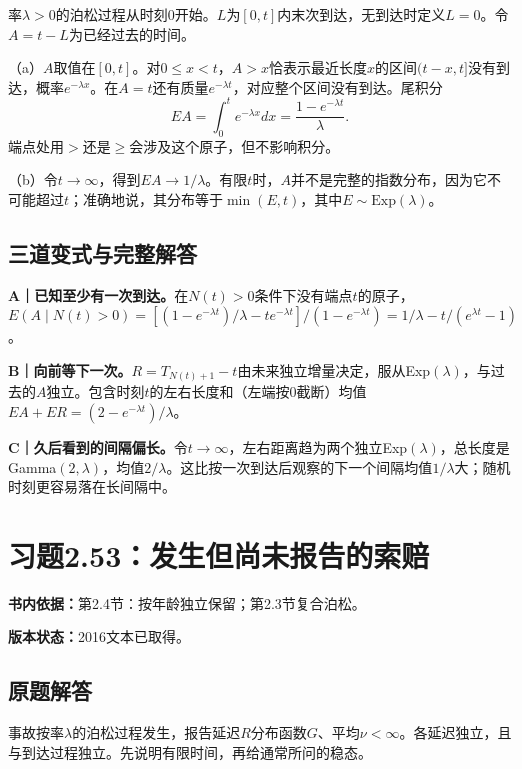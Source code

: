 \documentclass[
  11pt,
  a4paper,
  UTF8,fontset=fandol]{ctexart}
\let\OldSection\section
\renewcommand{\section}{\Needspace{7\baselineskip}\OldSection}
\let\OldSubsection\subsection
\renewcommand{\subsection}{\Needspace{5\baselineskip}\OldSubsection}
\begin{document}
率\(\lambda>0\)的泊松过程从时刻0开始。\(L\)为\([0,t]\)内末次到达，无到达时定义\(L=0\)。令\(A=t-L\)为已经过去的时间。

（a）\(A\)取值在\([0,t]\)。对\(0\le x<t\)，\(A>x\)恰表示最近长度\(x\)的区间\((t-x,t]\)没有到达，概率\(e^{-\lambda x}\)。在\(A=t\)还有质量\(e^{-\lambda t}\)，对应整个区间没有到达。尾积分
\[\boxed{EA=\int_0^t e^{-\lambda x}dx=\frac{1-e^{-\lambda t}}\lambda.}\]
端点处用\(>\)还是\(\ge\)会涉及这个原子，但不影响积分。

（b）令\(t\to\infty\)，得到\(\boxed{EA\to1/\lambda}\)。有限\(t\)时，\(A\)并不是完整的指数分布，因为它不可能超过\(t\)；准确地说，其分布等于\(\min(E,t)\)，其中\(E\sim\mathrm{Exp}(\lambda)\)。

\subsection{三道变式与完整解答}\label{ux4e09ux9053ux53d8ux5f0fux4e0eux5b8cux6574ux89e3ux7b54-51}

\textbf{A｜已知至少有一次到达。}在\(N(t)>0\)条件下没有端点\(t\)的原子，\(E(A\mid N(t)>0)=[(1-e^{-\lambda t})/\lambda-te^{-\lambda t}]/(1-e^{-\lambda t})=1/\lambda-t/(e^{\lambda t}-1)\)。

\textbf{B｜向前等下一次。}\(R=T_{N(t)+1}-t\)由未来独立增量决定，服从Exp\((\lambda)\)，与过去的\(A\)独立。包含时刻\(t\)的左右长度和（左端按0截断）均值\(EA+ER=(2-e^{-\lambda t})/\lambda\)。

\textbf{C｜久后看到的间隔偏长。}令\(t\to\infty\)，左右距离趋为两个独立Exp\((\lambda)\)，总长度是Gamma\((2,\lambda)\)，均值\(2/\lambda\)。这比按一次到达后观察的下一个间隔均值\(1/\lambda\)大；随机时刻更容易落在长间隔中。

\newpage

\section{习题2.53：发生但尚未报告的索赔}\label{ux4e60ux98982.53ux53d1ux751fux4f46ux5c1aux672aux62a5ux544aux7684ux7d22ux8d54}

\textbf{书内依据：}第2.4节：按年龄独立保留；第2.3节复合泊松。

\textbf{版本状态：}2016文本已取得。

\subsection{原题解答}\label{ux539fux9898ux89e3ux7b54-52}

事故按率\(\lambda\)的泊松过程发生，报告延迟\(R\)分布函数\(G\)、平均\(\nu<\infty\)。各延迟独立，且与到达过程独立。先说明有限时间，再给通常所问的稳态。
\end{document}
